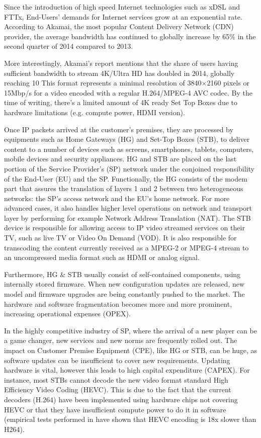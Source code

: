 Since the introduction of high speed Internet technologies such as xDSL and FTTx, End-Users’ demands for Internet services grow at an exponential rate.
According to Akamai, the most popular Content Delivery Network (CDN) provider, the average bandwidth has continued to globally increase by 65\% in the second quarter of 2014 \cite{_akamais_2014} compared to 2013.

More interestingly, Akamai’s report mentions that the share of users having sufficient bandwidth to stream 4K/Ultra HD has doubled in 2014, globally reaching 10%
This format represents a minimal resolution of 3840×2160 pixels or 15Mbp/s for a video encoded with a regular H.264/MPEG-4 AVC codec.
By the time of writing, there’s a limited amount of 4K ready Set Top Boxes due to hardware limitations (e.g. compute power, HDMI version).

Once IP packets arrived at the customer’s premises, they are processed by equipments such as Home Gateways (HG) and Set-Top Boxes (STB), to deliver content to a number of devices such as screens, smartphones, tablets, computers, mobile devices and security appliances.
HG and STB are placed on the last portion of the Service Provider’s (SP) network under the conjoined responsibility of the End-User (EU) and the SP.
Functionally, the HG consists of the modem part that assures the translation of layers 1 and 2 between two heterogeneous networks: the SP’s access network and the EU’s home network.
For more advanced cases, it also handles higher level operations on network and transport layer by performing for example Network Address Translation (NAT).
The STB device is responsible for allowing access to IP video streamed services on their TV, such as live TV or Video On Demand (VOD).
It is also responsible for transcoding the content currently received as a MPEG-2 or MPEG-4 stream to an uncompressed media format such as HDMI or analog signal.

Furthermore, HG \& STB usually consist of self-contained components, using internally stored firmware.
When new configuration updates are released, new model and firmware upgrades are being constantly pushed to the market.
The hardware and software fragmentation becomes more and more prominent, increasing operational expenses (OPEX). 

In the highly competitive industry of SP, where the arrival of a new player can be a game changer, new services and new norms are frequently rolled out.
The impact on Customer Premise Equipment (CPE), like HG or STB, can be huge, as software updates can be insufficient to cover new requirements.
Updating hardware is vital, however this leads to high capital expenditure (CAPEX).
For instance, most STBs cannot decode the new video format standard  High Efficiency Video Coding (HEVC).
This is due to the fact that the current decoders (H.264) have been implemented using hardware chips not covering HEVC or that they have insufficient compute power to do it in software (empirical tests performed in \cite{grois_performance_2013} have shown that HEVC encoding is 18x slower than H264).

